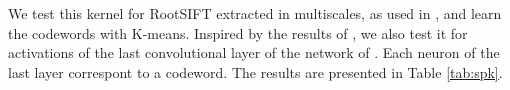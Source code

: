 We test this kernel for RootSIFT extracted in multiscales, as used in \cite{spk}, and learn the codewords with K-means. Inspired by the results of \cite{SPPCNN}, we also test it for activations of the last convolutional layer of the network of \cite{SimonZisser15}. Each neuron of the last layer correspont to a codeword. The results are presented in Table \ref{tab:spk}.

